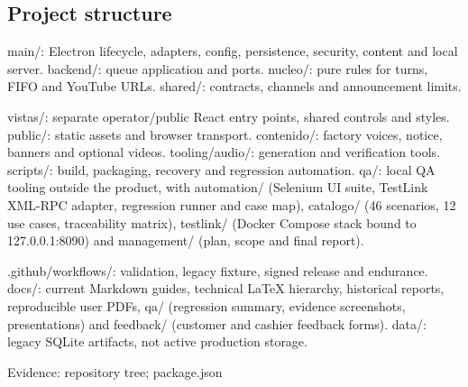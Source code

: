 \subsection{Project structure}

main/: Electron lifecycle, adapters, config, persistence, security, content and local server. backend/: queue application and ports. nucleo/: pure rules for turns, FIFO and YouTube URLs. shared/: contracts, channels and announcement limits.

vistas/: separate operator/public React entry points, shared controls and styles. public/: static assets and browser transport. contenido/: factory voices, notice, banners and optional videos. tooling/audio/: generation and verification tools. scripts/: build, packaging, recovery and regression automation. qa/: local QA tooling outside the product, with automation/ (Selenium UI suite, TestLink XML-RPC adapter, regression runner and case map), catalogo/ (46 scenarios, 12 use cases, traceability matrix), testlink/ (Docker Compose stack bound to 127.0.0.1:8090) and management/ (plan, scope and final report).

.github/workflows/: validation, legacy fixture, signed release and endurance. docs/: current Markdown guides, technical LaTeX hierarchy, historical reports, reproducible user PDFs, qa/ (regression summary, evidence screenshots, presentations) and feedback/ (customer and cashier feedback forms). data/: legacy SQLite artifacts, not active production storage.

Evidence: repository tree; package.json
